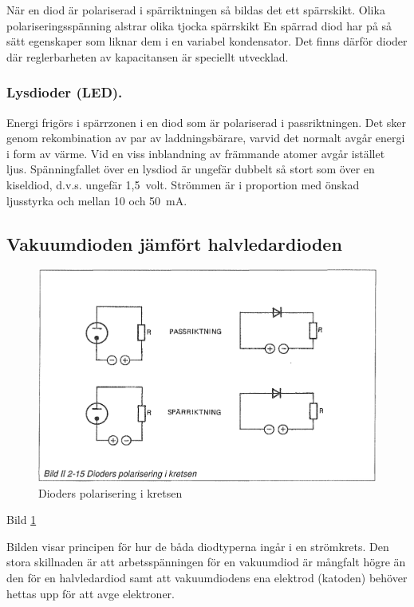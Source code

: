   När en diod är polariserad i spärriktningen så bildas det ett spärrskikt.
  Olika polariseringsspänning alstrar olika tjocka spärrskikt En spärrad diod
  har på så sätt egenskaper som liknar dem i en variabel kondensator. Det finns
  därför dioder där reglerbarheten av kapacitansen är speciellt utvecklad.

\subsubsection{Lysdioder (LED).}

  Energi frigörs i spärrzonen i en diod som är polariserad i passriktningen. Det
  sker genom rekombination av par av laddningsbärare, varvid det normalt avgår
  energi i form av värme. Vid en viss inblandning av främmande atomer avgår
  istället ljus. Spänningfallet över en lysdiod är ungefär dubbelt så stort som
  över en kiseldiod, d.v.s. ungefär 1,5~volt. Strömmen är i proportion med
  önskad ljusstyrka och mellan 10 och 50~mA.


\subsection{Vakuumdioden jämfört halvledardioden}

\begin{figure}
\includegraphics[width=\textwidth]{images/bild_2_2-15}
\caption{Dioders polarisering i kretsen}
\label{fig:BildII2-15}
\end{figure}

Bild \ref{fig:BildII2-15}

Bilden visar principen för hur de båda diodtyperna ingår i en strömkrets. Den
stora skillnaden är att arbetsspänningen för en vakuumdiod är mångfalt högre än
den för en halvledardiod samt att vakuumdiodens ena elektrod (katoden) behöver
hettas upp för att avge elektroner.
